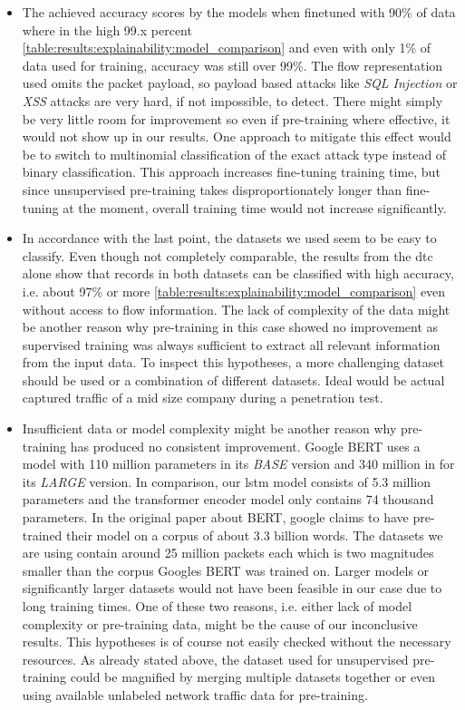 \begin{itemize}
	\item The achieved accuracy scores by the models when finetuned with 90\% of data where in the high 99.x percent \ref{table:results:explainability:model_comparison} and even with only 1\% of data used for training, accuracy was still over 99\%. The flow representation used omits the packet payload, so payload based attacks like \textit{SQL Injection} or \textit{XSS} attacks are very hard, if not impossible, to detect. There might simply be very little room for improvement so even if pre-training where effective, it would not show up in our results. One approach to mitigate this effect would be to switch to multinomial classification of the exact attack type instead of binary classification. This approach increases fine-tuning training time, but since 
	unsupervised pre-training takes disproportionately longer than fine-tuning at the moment, overall training time would not increase significantly.
	\item In accordance with the last point, the datasets we used seem to be easy to classify. Even though not completely comparable, the results from the \gls{dtc} alone show that records in both datasets can be classified with high accuracy, i.e. about 97\% or more \ref{table:results:explainability:model_comparison} even without access to flow information.
	The lack of complexity of the data might be another reason why pre-training in this case showed no improvement as supervised training was always sufficient to extract all relevant information from the input data. To inspect this hypotheses, a more challenging dataset should be used or a combination of different datasets. Ideal would be actual captured traffic of a mid size company during a penetration test. 
	\item Insufficient data or model complexity might be another reason why pre-training has produced no consistent improvement. Google BERT \cite{bert} uses a model with 110 million parameters in its \textit{BASE} version and 340 million in for its \textit{LARGE} version. In comparison, our \gls{lstm} model consists of 5.3 million parameters and the transformer encoder model only contains 74 thousand parameters. In the original paper about BERT, google claims to have pre-trained their model on a corpus of about 3.3 billion words. The datasets we are using contain around 25 million packets each which is two magnitudes smaller than the corpus Googles BERT was trained on. Larger models or significantly larger datasets would not have been feasible in our case due to long training times. One of these two reasons, i.e. either lack of model complexity or pre-training data, might be the cause of our inconclusive results. This hypotheses is of course not easily checked without the necessary resources. As already stated above, the dataset used for unsupervised pre-training could be magnified by merging multiple datasets together or even using available unlabeled network traffic data for pre-training.

\end{itemize}

